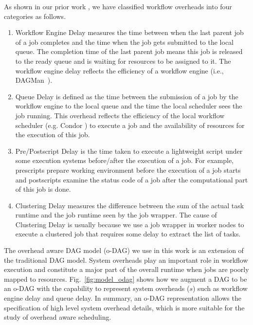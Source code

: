 As shown in our prior work \cite{Chen2011}, we have classified workflow overheads into four categories as follows. 
\begin{enumerate}

\item{Workflow Engine Delay} measures the time between when the last parent job of a job completes and the time when the job gets submitted to the local queue. The completion time of the last parent job means this job is released to the ready queue and is waiting for resources to be assigned to it. The workflow engine delay reflects the efficiency of a workflow engine (i.e., DAGMan~\cite{DAGMan}). 

\item{Queue Delay} is defined as the time between the submission of a job by the workflow engine to the local queue and the time the local scheduler sees the job running. This overhead reflects the efficiency of the local workflow scheduler (e.g. Condor \cite{Frey2002}) to execute a job and the availability of resources for the execution of this job. 

\item{Pre/Postscript Delay } is the time taken to execute a lightweight script under some execution systems before/after the execution of a job. For example, prescripts prepare working environment before the execution of a job starts and postscripts examine the status code of a job after the computational part of this job is done.

\item{Clustering Delay} measures the difference between the sum of the actual task runtime and the job runtime seen by the job wrapper. The cause of Clustering Delay is usually because we use a job wrapper in worker nodes to execute a clustered job that requires some delay to extract the list of tasks. 

\end{enumerate}

The overhead aware DAG model (o-DAG) we use in this work is an extension of the traditional DAG model. System overheads play an important role in workflow execution and constitute a major part of the overall runtime when jobs are poorly mapped to resources. Fig.~\ref{fig:model_odag} shows how we augment a DAG to be an o-DAG with the capability to represent system overheads ($s$) such as workflow engine delay and queue delay.  In summary, an o-DAG representation allows the specification of high level system overhead details, which is more suitable for the study of overhead aware scheduling. 